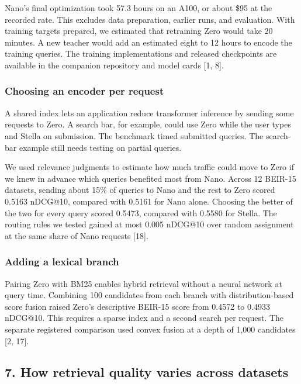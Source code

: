 \documentclass[
  english,
  10pt,
]{article}
\begin{document}
Nano's final optimization took 57.3 hours on an A100, or about \$95 at
the recorded rate. This excludes data preparation, earlier runs, and
evaluation. With training targets prepared, we estimated that retraining
Zero would take 20 minutes. A new teacher would add an estimated eight
to 12 hours to encode the training queries. The training implementations
and released checkpoints are available in the companion repository and
model cards {[}1, 8{]}.

\subsubsection{Choosing an encoder per
request}\label{choosing-an-encoder-per-request}

A shared index lets an application reduce transformer inference by
sending some requests to Zero. A search bar, for example, could use Zero
while the user types and Stella on submission. The benchmark timed
submitted queries. The search-bar example still needs testing on partial
queries.

We used relevance judgments to estimate how much traffic could move to
Zero if we knew in advance which queries benefited most from Nano.
Across 12 BEIR-15 datasets, sending about 15\% of queries to Nano and
the rest to Zero scored 0.5163 nDCG@10, compared with 0.5161 for Nano
alone. Choosing the better of the two for every query scored 0.5473,
compared with 0.5580 for Stella. The routing rules we tested gained at
most 0.005 nDCG@10 over random assignment at the same share of Nano
requests {[}18{]}.

\subsubsection{Adding a lexical branch}\label{adding-a-lexical-branch}

Pairing Zero with BM25 enables hybrid retrieval without a neural network
at query time. Combining 100 candidates from each branch with
distribution-based score fusion raised Zero's descriptive BEIR-15 score
from 0.4572 to 0.4933 nDCG@10. This requires a sparse index and a second
search per request. The separate registered comparison used convex
fusion at a depth of 1,000 candidates {[}2, 17{]}.

\subsection{7. How retrieval quality varies across
datasets}\label{how-retrieval-quality-varies-across-datasets}
\end{document}

